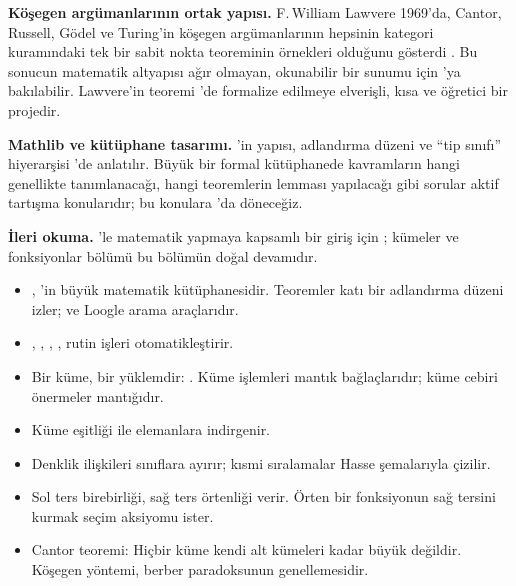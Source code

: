 \begin{arastirmanotu}
\textbf{Köşegen argümanlarının ortak yapısı.} F.\,William Lawvere 1969'da,
Cantor, Russell, Gödel ve Turing'in köşegen argümanlarının hepsinin
kategori kuramındaki tek bir sabit nokta teoreminin örnekleri olduğunu
gösterdi \citep{lawvere1969}. Bu sonucun matematik altyapısı ağır
olmayan, okunabilir bir sunumu için \citet{yanofsky2003}'ya bakılabilir.
Lawvere'in teoremi \Lean{}'de formalize edilmeye elverişli, kısa ve
öğretici bir projedir.

\textbf{Mathlib ve kütüphane tasarımı.} \Mathlib{}'in yapısı, adlandırma
düzeni ve ``tip sınıfı'' hiyerarşisi \citet{mathlib2020}'de anlatılır.
Büyük bir formal kütüphanede kavramların hangi genellikte tanımlanacağı,
hangi teoremlerin  lemması yapılacağı gibi sorular aktif
tartışma konularıdır; bu konulara 'da döneceğiz.

\textbf{İleri okuma.} \Mathlib{}'le matematik yapmaya kapsamlı bir giriş
için \citet{mil}; kümeler ve fonksiyonlar bölümü bu bölümün doğal
devamıdır.
\end{arastirmanotu}

\begin{bolumozeti}
\begin{itemize}
  \item \Mathlib{}, \Lean{}'in büyük matematik kütüphanesidir. Teoremler
        katı bir adlandırma düzeni izler;  ve Loogle arama
        araçlarıdır.
  \item {}, , ,
        ,  rutin işleri otomatikleştirir.
  \item Bir küme, bir yüklemdir: . Küme işlemleri
        mantık bağlaçlarıdır; küme cebiri önermeler mantığıdır.
  \item Küme eşitliği  ile elemanlara indirgenir.
  \item Denklik ilişkileri sınıflara ayırır; kısmi sıralamalar Hasse
        şemalarıyla çizilir.
  \item Sol ters birebirliği, sağ ters örtenliği verir. Örten bir
        fonksiyonun sağ tersini kurmak seçim aksiyomu ister.
  \item Cantor teoremi: Hiçbir küme kendi alt kümeleri kadar büyük
        değildir. Köşegen yöntemi, berber paradoksunun genellemesidir.
\end{itemize}
\end{bolumozeti}

